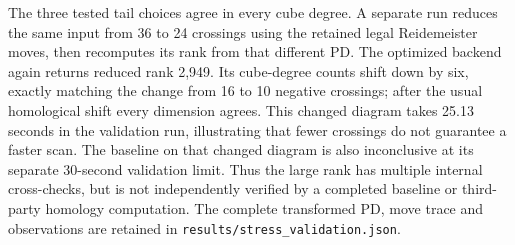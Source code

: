 The three tested tail choices agree in every cube degree. A separate run
reduces the same input from 36 to 24 crossings using the retained legal
Reidemeister moves, then recomputes its rank from that different PD.
The optimized backend again returns reduced rank 2,949. Its cube-degree
counts shift down by six, exactly matching the change from 16 to 10
negative crossings; after the usual homological shift every dimension
agrees. This changed diagram takes 25.13 seconds in the validation run,
illustrating that fewer crossings do not guarantee a faster scan.
The baseline on that changed diagram is also inconclusive at its separate
30-second validation limit. Thus the large rank has multiple internal
cross-checks, but is not independently verified by a completed baseline
or third-party homology computation. The complete transformed PD, move
trace and observations are retained in
\texttt{results/stress\_validation.json}.
